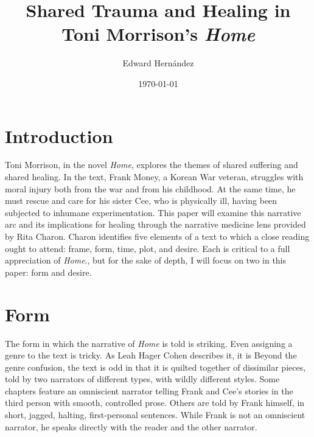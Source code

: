 \documentclass[12pt]{article}
\begin{document}
\title{Shared Trauma and Healing in Toni Morrison's \emph{Home}}
\author{Edward Hern\'{a}ndez}
\date{\today}

\maketitle


\vspace{12pt}

\section{Introduction} Toni Morrison, in the novel \emph{Home}\autocite{home},
explores the themes of shared suffering and shared healing. In the text, Frank
Money, a Korean War veteran, struggles with moral injury both from the war and
from his childhood. At the same time, he must rescue and care for his sister
Cee, who is physically ill, having been subjected to inhumane experimentation.
This paper will examine this narrative arc and its implications for healing
through the narrative medicine lens provided by Rita
Charon.\autocite[ch.~6]{narrative-medicine} Charon identifies five elements of
a text to which a close reading ought to attend: frame, form, time, plot, and
desire. Each is critical to a full appreciation of \emph{Home}., but for the
sake of depth, I will focus on two in this paper: form and desire.

\section{Form}

The form in which the narrative of \emph{Home} is told is striking. Even
assigning a genre to the text is tricky. As Leah Hager Cohen describes it, it
is \autocite{point-of-return} Beyond the genre
confusion, the text is odd in that it is quilted together of dissimilar pieces,
told by two narrators of different types, with wildly different styles. Some
chapters feature an omniscient narrator telling Frank and Cee's stories in the
third person with smooth, controlled prose. Others are told by Frank himself,
in short, jagged, halting, first-personal sentences. While Frank is not an
omniscient narrator, he speaks directly with the reader and the other narrator.
\end{document}
